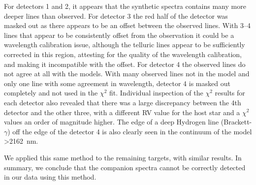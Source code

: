 \documentclass[fleqn,usenatbib]{mnras}
\begin{document}
    For detectors 1 and 2, it appears that the synthetic spectra contains many more deeper lines than observed. For detector 3 the red half of the detector was masked out as there appears to be an offset between the observed lines. With 3--4 lines that appear to be consistently offset from the observation it could be a wavelength calibration issue, although the telluric lines appear to be sufficiently corrected in this region, attesting for the quality of the wavelength calibration, and making it incompatible with the offset. For detector 4 the observed lines do not agree at all with the models. With many observed lines not in the model and only one line with some agreement in wavelength, detector 4 is masked out completely and not used in the \(\chi^2\) fit. Individual inspection of the \(\chi^2\) results for each detector also revealed that there was a large discrepancy between the 4th detector and the other three, with a different RV value for the host star and a \(\chi^2\) values an order of magnitude higher. The edge of a deep Hydrogen line (Brackett-\(\gamma\)) off the edge of the detector 4 is also clearly seen in the continuum of the model >2162~nm.
    
    We applied this same method to the remaining targets, with similar results. In summary, we conclude that the companion spectra cannot be correctly detected in our data using this method.
    
\end{document}

